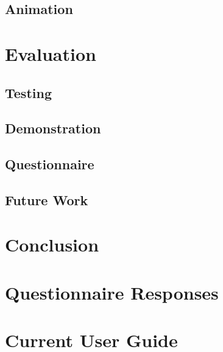 \documentclass{l3proj}
\begin{document}
\section{Animation}
\label{impl:anim}


\chapter{Evaluation}
\label{eval}

\section{Testing}
\label{eval:testing}


\section{Demonstration}
\label{eval:demo}


\section{Questionnaire}
\label{eval:question}


\section{Future Work}
\label{eval:future}



\chapter{Conclusion}
\label{conc}

\appendix

\chapter{Questionnaire Responses}
\label{app:questionnaireResponses}


\chapter{Current User Guide}
\label{app:userGuideCurrent}

\end{document}
